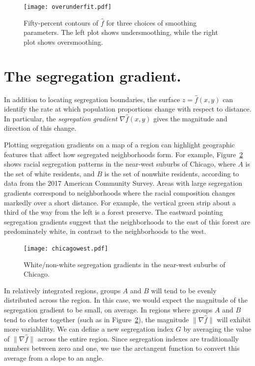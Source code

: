 \documentclass{article}
\theoremstyle{theorem}
\theoremstyle{definition}
\begin{document}
\begin{figure}
  \texttt{[image: overunderfit.pdf]}
  \caption{Fifty-percent contours of $\hat{f}$ for three choices of smoothing parameters. The left plot shows undersmoothing, while the right plot shows oversmoothing.}
  \label{fig:overunderfit}
\end{figure}

\section{The segregation gradient.}

In addition to locating segregation boundaries, the surface $z = \hat{f}(x,y)$ can identify the rate at which population proportions change with respect to distance. In particular, the \textit{segregation gradient} $\nabla \hat{f}(x,y)$ gives the magnitude and direction of this change.

Plotting segregation gradients on a map of a region can highlight geographic features that affect how segregated neighborhoods form. For example, Figure~\ref{fig:chicagowest} shows racial segregation patterns in the near-west suburbs of Chicago, where $A$ is the set of white residents, and $B$ is the set of nonwhite residents, according to data from the 2017 American Community Survey. Areas with large segregation gradients correspond to neighborhoods where the racial composition changes markedly over a short distance. For example, the vertical green strip about a third of the way from the left is a forest preserve. The eastward pointing segregation gradients suggest that the neighborhoods to the east of this forest are predominately white, in contrast to the neighborhoods to the west.

\begin{figure}
  \texttt{[image: chicagowest.pdf]}
  \caption{White/non-white segregation gradients in the near-west suburbs of Chicago.}
  \label{fig:chicagowest}
\end{figure}

In relatively integrated regions, groups $A$ and $B$ will tend to be evenly distributed across the region. In this case, we would expect the magnitude of the segregation gradient to be small, on average. In regions where groups $A$ and $B$ tend to cluster together (such as in Figure~\ref{fig:chicagowest}), the magnitude $\lVert \nabla \hat{f} \rVert$ will exhibit more variablility. We can define a new segregation index $G$ by averaging the value of  $\lVert \nabla \hat{f} \rVert$ across the entire region. Since segregation indexes are traditionally numbers between zero and one, we use the arctangent function to convert this average from a slope to an angle.
\end{document}
